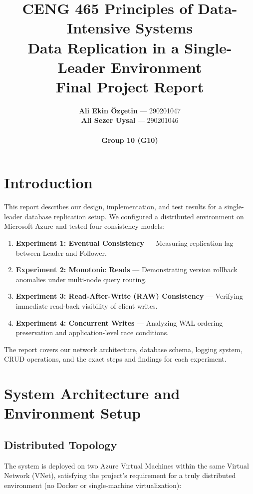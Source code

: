 \documentclass[12pt]{article}
\title{\textbf{CENG 465 Principles of Data-Intensive Systems}\\
\Large Data Replication in a Single-Leader Environment\\
\large Final Project Report}
\author{
\textbf{Ali Ekin \"Oz\c{c}etin} --- 290201047 \\
\textbf{Ali Sezer Uysal} --- 290201046 \\[10pt]
\institute{Izmir Institute of Technology \\ Computer Engineering Department}\\
\textbf{Group 10 (G10)}
}
\date{}
\begin{document}
\maketitle

\newpage
\tableofcontents
\newpage

\section{Introduction}
This report describes our design, implementation, and test results for a single-leader database replication setup. We configured a distributed environment on Microsoft Azure and tested four consistency models:
\begin{enumerate}
    \item \textbf{Experiment 1: Eventual Consistency} --- Measuring replication lag between Leader and Follower.
    \item \textbf{Experiment 2: Monotonic Reads} --- Demonstrating version rollback anomalies under multi-node query routing.
    \item \textbf{Experiment 3: Read-After-Write (RAW) Consistency} --- Verifying immediate read-back visibility of client writes.
    \item \textbf{Experiment 4: Concurrent Writes} --- Analyzing WAL ordering preservation and application-level race conditions.
\end{enumerate}

The report covers our network architecture, database schema, logging system, CRUD operations, and the exact steps and findings for each experiment.

\section{System Architecture and Environment Setup}

\subsection{Distributed Topology}
The system is deployed on two Azure Virtual Machines within the same Virtual Network (VNet), satisfying the project's requirement for a truly distributed environment (no Docker or single-machine virtualization):
\end{document}
